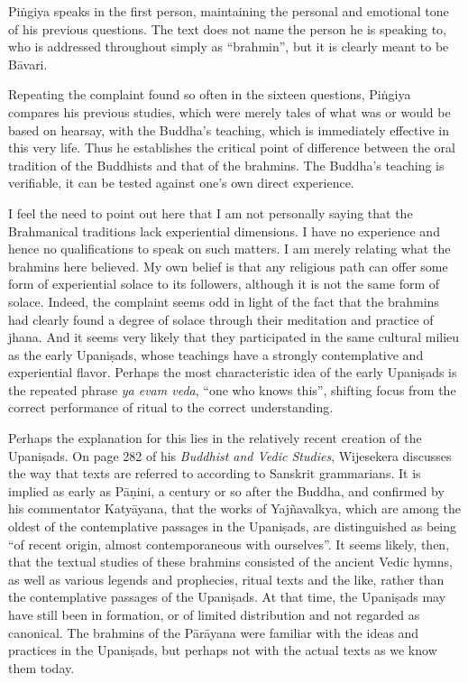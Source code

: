 \documentclass[12pt,openany]{book}%
\begin{document}
\textsanskrit{Piṅgiya} speaks in the first person, maintaining the personal and emotional tone of his previous questions. The text does not name the person he is speaking to, who is addressed throughout simply as “brahmin”, but it is clearly meant to be \textsanskrit{Bāvari}.

Repeating the complaint found so often in the sixteen questions, \textsanskrit{Piṅgiya} compares his previous studies, which were merely tales of what was or would be based on hearsay, with the Buddha’s teaching, which is immediately effective in this very life. Thus he establishes the critical point of difference between the oral tradition of the Buddhists and that of the brahmins. The Buddha’s teaching is verifiable, it can be tested against one’s own direct experience.

I feel the need to point out here that I am not personally saying that the Brahmanical traditions lack experiential dimensions. I have no experience and hence no qualifications to speak on such matters. I am merely relating what the brahmins here believed. My own belief is that any religious path can offer some form of experiential solace to its followers, although it is not the same form of solace. Indeed, the complaint seems odd in light of the fact that the brahmins had clearly found a degree of solace through their meditation and practice of jhana. And it seems very likely that they participated in the same cultural milieu as the early \textsanskrit{Upaniṣads}, whose teachings have a strongly contemplative and experiential flavor. Perhaps the most characteristic idea of the early \textsanskrit{Upaniṣads} is the repeated phrase \textit{ya evam veda}, “one who knows this”, shifting focus from the correct performance of ritual to the correct understanding.

Perhaps the explanation for this lies in the relatively recent creation of the \textsanskrit{Upaniṣads}. On page 282 of his \textit{Buddhist and Vedic Studies}, Wijesekera discusses the way that texts are referred to according to Sanskrit grammarians. It is implied as early as \textsanskrit{Pāṇini}, a century or so after the Buddha, and confirmed by his commentator \textsanskrit{Katyāyana}, that the works of \textsanskrit{Yajñavalkya}, which are among the oldest of the contemplative passages in the \textsanskrit{Upaniṣads}, are distinguished as being “of recent origin, almost contemporaneous with ourselves”. It seems likely, then, that the textual studies of these brahmins consisted of the ancient Vedic hymns, as well as various legends and prophecies, ritual texts and the like, rather than the contemplative passages of the \textsanskrit{Upaniṣads}. At that time, the \textsanskrit{Upaniṣads} may have still been in formation, or of limited distribution and not regarded as canonical. The brahmins of the \textsanskrit{Pārāyana} were familiar with the ideas and practices in the \textsanskrit{Upaniṣads}, but perhaps not with the actual texts as we know them today.
\end{document}
